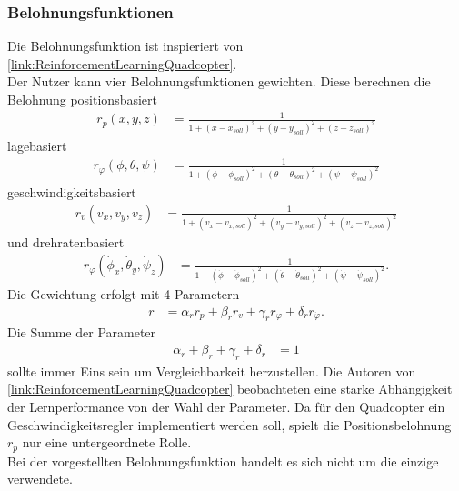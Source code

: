 \subsubsection{\label{Belohnung}Belohnungsfunktionen}
Die Belohnungsfunktion ist inspieriert von \ref{link:ReinforcementLearningQuadcopter}. \\
Der Nutzer kann vier Belohnungsfunktionen gewichten.
Diese berechnen die Belohnung positionsbasiert
\begin{align}
r_p(x, y, z) &= \frac{1}{1 + (x - x_{soll})^2 + (y - y_{soll})^2 + (z - z_{soll})^2}
\end{align}
lagebasiert
\begin{align}
r_{\varphi}(\phi, \theta, \psi) &= \frac{1}{1 + (\phi - \phi_{soll})^2 + (\theta - \theta_{soll})^2 + (\psi - \psi_{soll})^2}
\end{align}
geschwindigkeitsbasiert
\begin{align}
r_v(v_x, v_y, v_z) &= \frac{1}{1 + (v_x - v_{x, soll})^2 + (v_y - v_{y, soll})^2 + (v_z - v_{z, soll})^2}
\end{align}
und drehratenbasiert
\begin{align}
r_{\dot{\varphi}}(\dot{\phi}_x, \dot{\theta}_y, \dot{\psi}_z) &= \frac{1}{1 + (\dot{\phi} - \dot{\phi}_{soll})^2 + (\dot{\theta} - \dot{\theta}_{soll})^2 + (\dot{\psi} - \dot{\psi}_{soll})^2}.
\end{align}
Die Gewichtung erfolgt mit 4 Parametern 
\begin{align}
r &= \alpha_r r_p + \beta_r r_v + \gamma_r r_{\varphi} + \delta_r r_{\dot{\varphi}}.
\end{align}
Die Summe der Parameter
\begin{align}
\alpha_r + \beta_r + \gamma_r + \delta_r &= 1 
\end{align}
sollte immer Eins sein um Vergleichbarkeit herzustellen.
Die Autoren von \ref{link:ReinforcementLearningQuadcopter} beobachteten eine starke Abhängigkeit der Lernperformance von der Wahl der Parameter. Da für den Quadcopter ein Geschwindigkeitsregler implementiert werden soll, spielt die Positionsbelohnung $r_p$ nur eine untergeordnete Rolle.\\
Bei der vorgestellten Belohnungsfunktion handelt es sich nicht um die einzige verwendete.

